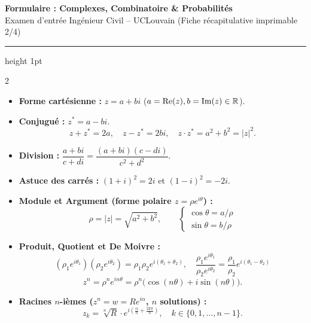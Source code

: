 \begin{center}
    {\LARGE\bfseries\color{uclblue} Formulaire : Complexes, Combinatoire \& Probabilités}\\[2pt]
    {\small\color{darkgray} Examen d'entrée Ingénieur Civil -- UCLouvain (Fiche récapitulative imprimable 2/4)}
    \vspace{2pt}
    \hrule height 1pt
\end{center}
\vspace{-6pt}

{\fontsize{9.5pt}{11.5pt}\selectfont
\setlength{\columnsep}{18pt}
\begin{multicols}{2}

\begin{itemize}[leftmargin=1.2em, itemsep=1.5pt, topsep=2pt]
    \item \textbf{Forme cartésienne :} $z = a + bi$ ($a = \operatorname{Re}(z), b = \operatorname{Im}(z) \in \mathbb{R}$).
    \item \textbf{Conjugué :} $z^* = a - bi$.
    \[
        z + z^* = 2a, \quad z - z^* = 2bi, \quad \boxed{z \cdot z^* = a^2 + b^2 = |z|^2}.
    \]
    \item \textbf{Division :} $\dfrac{a + bi}{c + di} = \dfrac{(a + bi)(c - di)}{c^2 + d^2}$.
    \item \textbf{Astuce des carrés :} $(1 + i)^2 = 2i$ et $(1 - i)^2 = -2i$.
    \item \textbf{Module et Argument (forme polaire $z = \rho e^{i\theta}$) :}
    \[
        \rho = |z| = \sqrt{a^2 + b^2}, \qquad \begin{cases} \cos\theta = a/\rho \\ \sin\theta = b/\rho \end{cases}
    \]
    \item \textbf{Produit, Quotient et De Moivre :}
    \[
        (\rho_1 e^{i\theta_1})(\rho_2 e^{i\theta_2}) = \rho_1\rho_2 e^{i(\theta_1+\theta_2)}, \quad \frac{\rho_1 e^{i\theta_1}}{\rho_2 e^{i\theta_2}} = \frac{\rho_1}{\rho_2}e^{i(\theta_1-\theta_2)}
    \]
    \[
        \boxed{z^n = \rho^n e^{in\theta} = \rho^n\bigl(\cos(n\theta) + i\sin(n\theta)\bigr)}.
    \]
    \item \textbf{Racines $n$-ièmes ($z^n = w = R e^{i\alpha}$, $n$ solutions) :}
    \[
        \boxed{z_k = \sqrt[n]{R} \cdot e^{i\left(\frac{\alpha}{n} + \frac{2k\pi}{n}\right)}, \quad k \in \{0, 1, \dots, n-1\}}.
    \]
\end{itemize}


\end{multicols}}

